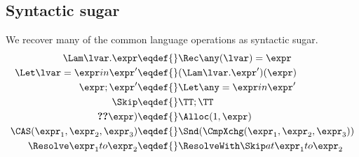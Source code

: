 \subsection{Syntactic sugar}

We recover many of the common language operations as syntactic sugar.
\begin{align*}
  \Lam \lvar. \expr \eqdef{}& \Rec\any(\lvar)= \expr \\
  \Let \lvar = \expr in \expr' \eqdef{}& (\Lam \lvar. \expr')(\expr) \\
  \expr; \expr' \eqdef{}& \Let \any = \expr in \expr' \\
  \Skip \eqdef{}& \TT; \TT \\
  \Ref(\expr) \eqdef{}& \Alloc(1,\expr) \\
  \CAS(\expr_1, \expr_2, \expr_3) \eqdef{}& \Snd(\CmpXchg(\expr_1, \expr_2, \expr_3)) \\
  \Resolve \expr_1 to \expr_2 \eqdef{}& \ResolveWith \Skip at \expr_1 to \expr_2
\end{align*}

